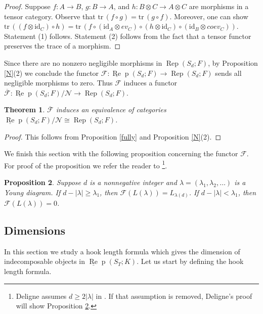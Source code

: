 \documentclass{amsart}
\newtheorem{theorem}{Theorem}[section]
\newtheorem{proposition}[theorem]{Proposition}
\theoremstyle{definition}
\newcommand{\id}{\text{id}}
\def\uRep{\underline{\operatorname{Re}}\!\operatorname{p}}
\newcommand{\Rep}{\operatorname{Rep}}
\newcommand{\tr}{\text{tr}\,}
\renewcommand{\1}{_{(1)}}
\renewcommand{\2}{_{(2)}}
\newcommand{\3}{_{(3)}}
\newcommand{\4}{_{(4)}}
\newcommand{\cat}{\mathcal}
\begin{document}
\begin{proof} Suppose $f:A\to B$, $g:B\to A$, and $h:B\otimes C\to A\otimes C$ are morphisms in a tensor category.  Observe that $\tr(f\circ g)=\tr(g\circ f)$.  Moreover, one can show $\tr((f\otimes \id_C)\circ h)=\tr(f\circ(\id_A\otimes ev_C)\circ (h\otimes\id_C)\circ(\id_B\otimes coev_C))$.  Statement (1) follows.  Statement (2) follows from the fact that a tensor functor preserves the trace of a morphism.
\end{proof}

Since there are no nonzero negligible morphisms in $\Rep(S_d; F)$, by Proposition \ref{N}(2) we conclude the functor $\cat{F}:\uRep(S_d; F)\to \Rep(S_d; F)$ sends all negligible morphisms to zero.  Thus $\cat{F}$ induces a functor $\cat{\overline{F}}:\uRep(S_d; F)/\cat{N}\to \Rep(S_d; F)$.

\begin{theorem} $\cat{\overline{F}}$ induces an equivalence of categories $\uRep(S_d; F)/\cat{N}\cong \Rep(S_d; F)$.
\end{theorem}

\begin{proof} This follows from Proposition \ref{fully} and Proposition \ref{N}(2).
\end{proof}

We finish this section with the following proposition concerning the functor $\cat{F}$.  For proof of the proposition we refer the reader to \cite[Proposition 6.4]{Del07}\footnote{Deligne assumes $d\geq 2|\lambda|$ in \cite[Proposition 6.4]{Del07}.  If that assumption is removed, Deligne's proof will show Proposition \ref{Findy}.}.

\begin{proposition}\label{Findy}  Suppose $d$ is a nonnegative integer and $\lambda=(\lambda_1, \lambda_2, \ldots)$ is a Young diagram. 
If $d-|\lambda|\geq \lambda_1$, then $\cat{F}(L(\lambda))=L_{\lambda(d)}$.  If $d-|\lambda|<\lambda_1$, then $\cat{F}(L(\lambda))=0$.

\end{proposition}




\subsection{Dimensions}\label{dim} In this section we study a hook length formula which gives the dimension of indecomposable objects in $\uRep(S_T; K)$.    Let us start by defining the hook length formula.
\end{document}
